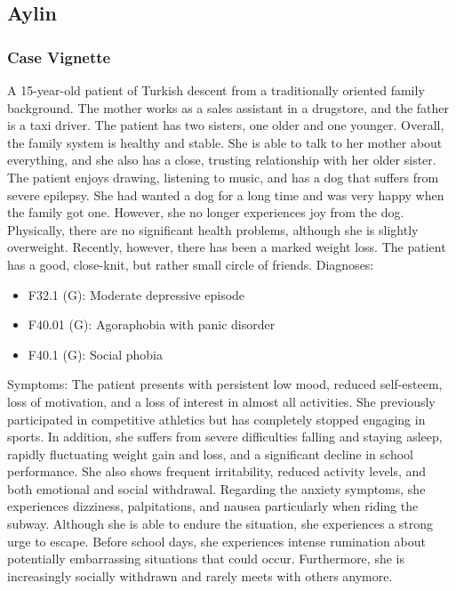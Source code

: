 \documentclass[sigconf,natbib=false]{acmart}
\begin{document}
\subsection{Aylin \autocite[slide~15]{dbjr_stoerungsbilder}}
\label{app:AylinFull}
\subsubsection{Case Vignette}
A 15-year-old patient of Turkish descent from a traditionally oriented family background.
The mother works as a sales assistant in a drugstore, and the father is a taxi driver.
The patient has two sisters, one older and one younger.
Overall, the family system is healthy and stable.
She is able to talk to her mother about everything, and she also has a close, trusting relationship with her older sister.
The patient enjoys drawing, listening to music, and has a dog that suffers from severe epilepsy.
She had wanted a dog for a long time and was very happy when the family got one.
However, she no longer experiences joy from the dog.
Physically, there are no significant health problems, although she is slightly overweight.
Recently, however, there has been a marked weight loss.
The patient has a good, close-knit, but rather small circle of friends.
Diagnoses:
\begin{itemize} 
\item F32.1 (G): Moderate depressive episode
\item F40.01 (G): Agoraphobia with panic disorder
\item F40.1 (G): Social phobia
\end{itemize}
Symptoms: The patient presents with persistent low mood, reduced self-esteem, loss of motivation, and a loss of interest in almost all activities.
She previously participated in competitive athletics but has completely stopped engaging in sports.
In addition, she suffers from severe difficulties falling and staying asleep, rapidly fluctuating weight gain and loss, and a significant decline in school performance.
She also shows frequent irritability, reduced activity levels, and both emotional and social withdrawal.
Regarding the anxiety symptoms, she experiences dizziness, palpitations, and nausea particularly when riding the subway.
Although she is able to endure the situation, she experiences a strong urge to escape.
Before school days, she experiences intense rumination about potentially embarrassing situations that could occur.
Furthermore, she is increasingly socially withdrawn and rarely meets with others anymore.
\end{document}
